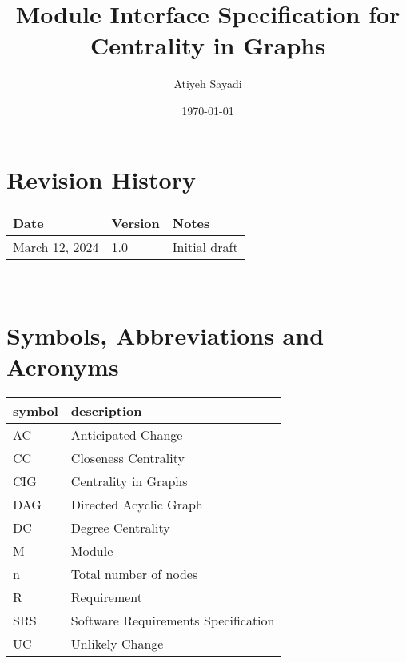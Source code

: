 \documentclass[12pt, titlepage]{article}
\begin{document}
\title{Module Interface Specification for Centrality in Graphs}

\author{Atiyeh Sayadi}

\date{\today}

\maketitle


\section{Revision History}

\begin{tabularx}{\textwidth}{p{3cm}p{2cm}X}
\toprule {\bf Date} & {\bf Version} & {\bf Notes}\\
\midrule
March 12, 2024 & 1.0 & Initial draft\\
\bottomrule
\end{tabularx}

~\newpage

\section{Symbols, Abbreviations and Acronyms}

\renewcommand{\arraystretch}{1.2}
\begin{tabular}{l l} 
  \toprule		
  \textbf{symbol} & \textbf{description}\\
  \midrule 
  AC & Anticipated Change\\
CC & Closeness Centrality\\
  CIG& Centrality in Graphs\\
  DAG & Directed Acyclic Graph \\
DC & Degree Centrality\\
  M & Module \\
 n & Total number of nodes \\
  R & Requirement\\
  SRS & Software Requirements Specification\\
  UC & Unlikely Change \\
  \bottomrule
\end{tabular}\\

\newpage

\tableofcontents

\newpage

\end{document}
